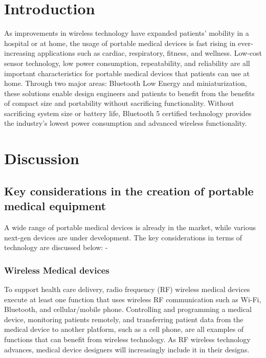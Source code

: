 \documentclass[12pt]{article}
\begin{document}
\clearpage
{}
\section{Introduction}

As improvements in wireless technology have expanded patients' mobility in a hospital or at home, the usage of portable medical devices is fast rising in ever-increasing applications such as cardiac, respiratory, fitness, and wellness. Low-cost sensor technology, low power consumption, repeatability, and reliability are all important characteristics for portable medical devices that patients can use at home. Through two major areas: Bluetooth Low Energy and miniaturization, these solutions enable design engineers and patients to benefit from the benefits of compact size and portability without sacrificing functionality. Without sacrificing system size or battery life, Bluetooth 5 certified technology provides the industry's lowest power consumption and advanced wireless functionality.


\section{Discussion}
\subsection{Key considerations in the creation of portable medical equipment}

A wide range of portable medical devices is already in the market, while various next-gen devices are under development.  The key considerations in terms of technology are discussed below:  -

\subsubsection{Wireless Medical devices}
To support health care delivery, radio frequency (RF) wireless medical devices execute at least one function that uses wireless RF communication such as Wi-Fi, Bluetooth, and cellular/mobile phone. Controlling and programming a medical device, monitoring patients remotely, and transferring patient data from the medical device to another platform, such as a cell phone, are all examples of functions that can benefit from wireless technology. As RF wireless technology advances, medical device designers will increasingly include it in their designs.\cite{Borad:2021}
\end{document}
